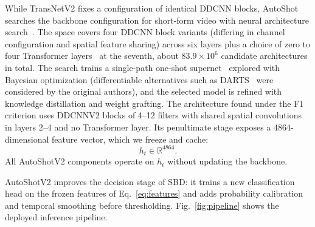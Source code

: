 While TransNetV2 fixes a configuration of identical DDCNN blocks, AutoShot
searches the backbone configuration for short-form video with neural
architecture search~\cite{zhu2023autoshot,elsken2019nas,white2023_nas1000,ren2020_nas_survey}.
The space covers four DDCNN block variants (differing in channel
configuration and spatial feature sharing) across six layers plus a choice
of zero to four Transformer layers~\cite{vaswani2017attention} at the
seventh, about $83.9\times10^6$ candidate architectures in total. The search
trains a single-path one-shot supernet~\cite{guo2020spos} explored with
Bayesian optimization (differentiable alternatives such as
DARTS~\cite{liu2019darts} were considered by the original authors), and the
selected model is refined with knowledge distillation and weight grafting.
The architecture found under the F1 criterion uses DDCNNV2 blocks of 4--12
filters with shared spatial convolutions in layers 2--4 and no Transformer
layer. Its penultimate stage exposes a 4864-dimensional feature vector,
which we freeze and cache:
\begin{equation}
    h_t \in \mathbb{R}^{4864}.
    \label{eq:features}
\end{equation}
All AutoShotV2 components operate on $h_t$ without updating the backbone.

AutoShotV2 improves the decision stage of SBD: it trains a new
classification head on the frozen features of Eq.~\eqref{eq:features} and
adds probability calibration and temporal smoothing before thresholding.
Fig.~\ref{fig:pipeline} shows the deployed inference pipeline.

